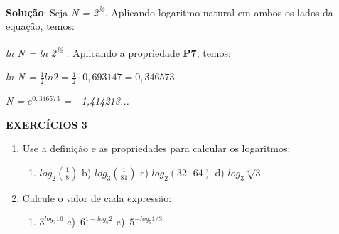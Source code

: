 \documentclass[12pt]{article}
\begin{document}
\begin{enumerate}[label*={\fontsize{14pt}{14pt}\selectfont \textbf{\arabic*.}}]
\begin{justify}
\textbf{Solução}: Seja \textit{N = 2\textsuperscript{½}}. Aplicando logaritmo natural em ambos os lados da equação, temos:
\end{justify}\par

\begin{justify}
\textit{ln N = ln} \textit{2\textsuperscript{½} . }Aplicando a propriedade \textbf{P7}, temos:
\end{justify}\par

\begin{justify}
\textit{ln N =  \( \frac{1}{2}ln2=\frac{1}{2} \cdot 0,693147=0,346573 \) }\  
\end{justify}\par

\begin{justify}
\textit{N =}  \( e^{0,346573} \)  \textit{=\ \  1,414213...} 
\end{justify}\par


\vspace{\baselineskip}
\begin{justify}
\textbf{EXERCÍCIOS 3}
\end{justify}\par

\begin{enumerate}
	\item Use a definição e as propriedades para calcular os logaritmos:\par

\begin{enumerate}
	\item  \( log_{2} \left( \frac{1}{8} \right)  \) \tab \tab b)  \( log_{3} \left( \frac{1}{81} \right)  \) \tab \tab c)  \( log_{2} \left( 32 \cdot 64 \right)  \) \tab d)  \( log_{3}\sqrt[4]{3} \)  
\end{enumerate}\par


\vspace{\baselineskip}
	\item Calcule o valor de cada expressão:\par

\begin{enumerate}
	\item  \( 3^{log_{3}16} \) \tab \tab c)\   \( 6^{1-log_{6}2} \) \tab \tab e)\   \( 5^{-log_{5}1/3} \) \par


\end{enumerate}
\end{enumerate}
\end{enumerate}
\end{document}
